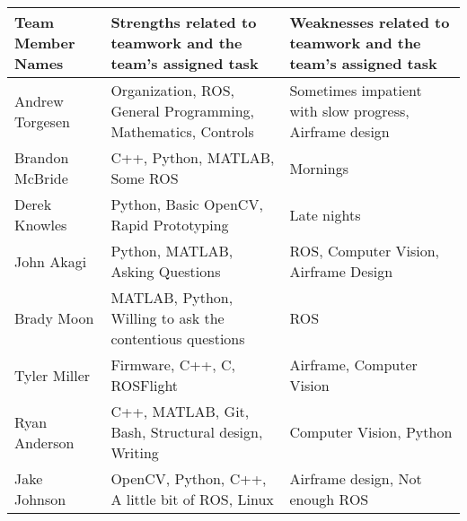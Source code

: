 \begin{table}[H]
\centering
\begin{tabular}{|p{3.5cm}|p{5.35cm}|p{5.35cm}|}
\hline
\rowcolor[HTML]{C0C0C0}
{\color[HTML]{000000} \textbf{Team Member Names}} & {\color[HTML]{000000} \textbf{Strengths related to teamwork and the team's assigned task}} & {\color[HTML]{000000} \textbf{Weaknesses related to teamwork and the team's assigned task}} \\ \hline
Andrew Torgesen                                   & Organization, ROS, General Programming, Mathematics, Controls                              & Sometimes impatient with slow progress, Airframe design                                     \\ \hline
Brandon McBride                                   & C++, Python, MATLAB, Some ROS                                                              & Mornings                                                                                    \\ \hline
Derek Knowles                                     & Python, Basic OpenCV, Rapid Prototyping                                                    & Late nights                                                                                 \\ \hline
John Akagi                                        & Python, MATLAB, Asking Questions                                                           & ROS, Computer Vision, Airframe Design                                                       \\ \hline
Brady Moon                                        & MATLAB, Python, Willing to ask the contentious questions                                   & ROS                                                                                         \\ \hline
Tyler Miller                                      & Firmware, C++, C, ROSFlight                                                                & Airframe, Computer Vision                                                                   \\ \hline
Ryan Anderson                                     & C++, MATLAB, Git, Bash, Structural design, Writing                                         & Computer Vision, Python                                                                     \\ \hline
Jake Johnson                                      & OpenCV, Python, C++, A little bit of ROS, Linux                                            & Airframe design, Not enough ROS                                                             \\ \hline

\end{tabular}
\end{table}

